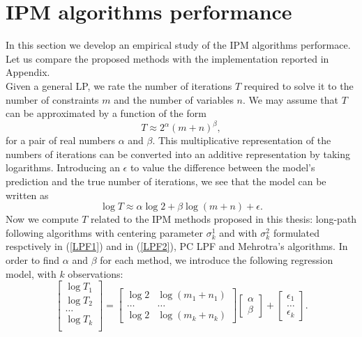 \documentclass[a4paper,10 pt,titlepage,twoside]{book}
\theoremstyle{plain}
\theoremstyle{definition}
\theoremstyle{remark}
\begin{document}
\section{IPM algorithms performance}
In this section we develop an empirical study of the IPM algorithms performace. Let us compare the proposed methods with the implementation reported in Appendix. \\
Given a general LP, we rate the number of iterations $T$ required to solve it to the number of constraints $m$ and the number of variables $n$. We may assume that $T$ can be approximated by a function of the form 
\begin{equation*}
	T \approx 2^{\alpha}(m+n)^{\beta},
\end{equation*}
for a pair of real numbers $\alpha$ and $\beta$. This multiplicative representation of the numbers of iterations can be converted into an additive representation by taking logarithms. Introducing an $\epsilon$ to value the difference between the model's prediction and the true number of iterations, we see that the model can be written as
\begin{equation*}
\log T \approx \alpha \log 2 +\beta \log (m+n) +\epsilon.
\end{equation*}
Now we compute $T$ related to the IPM methods proposed in this thesis: long-path following algorithms with centering parameter $\sigma_{k}^{1}$ and with $\sigma_{k}^{2}$ formulated respctively in (\ref{LPF1}) and in (\ref{LPF2}), PC LPF and Mehrotra's algorithms. In order to find $\alpha$ and $\beta$  for each method, we introduce the following regression model, with $k$ observations:\\
\begin{equation}
\begin{bmatrix}
\log T_{1}\\\log T_{2}\\\dots\\\log T_{k}\\
\end{bmatrix}
 =
 \begin{bmatrix}
\log 2&\log (m_{1}+n_{1})\\
\dots&\dots\\
\log 2&\log (m_{k}+n_{k})
\end{bmatrix}\begin{bmatrix}
\alpha\\\beta
\end{bmatrix}
+
\begin{bmatrix}
\epsilon_{1}\\
\dots\\
\epsilon_{k}
\end{bmatrix}.
\end{equation}
\end{document}
